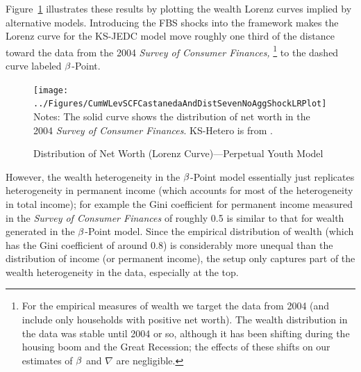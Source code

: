\documentclass[12pt,titlepage]{econtex}
\begin{document}
Figure~\ref{CumWLevSCFCastanedaAndDistSevenNoAggShockPlot}
illustrates these results by plotting the wealth Lorenz curves
implied by alternative models. Introducing the FBS shocks into the
framework makes the Lorenz curve for the KS-JEDC  model move roughly
one third of the distance toward the data from the 2004 \emph{Survey of
Consumer Finances,}%
\footnote{%
For the empirical measures of wealth we target the data from 2004 (and include only households with positive net worth). The wealth distribution in the data was stable until 2004 or so, although it has been shifting
during the housing boom and the Great Recession; the effects of these shifts on our estimates of
 $\beta$ and $\nabla$ are negligible.
}
 to the dashed curve labeled $\beta$-Point.

\begin{figure}
\caption{Distribution of Net Worth (Lorenz Curve)---Perpetual Youth Model}
\label{CumWLevSCFCastanedaAndDistSevenNoAggShockPlot}
\texttt{[image: ../Figures/CumWLevSCFCastanedaAndDistSevenNoAggShockLRPlot]}
\footnotesize Notes: The solid curve shows the distribution of net worth in the 2004 \emph{Survey of Consumer Finances}. KS-Hetero is from \citet{ksHetero}.
\end{figure}

However, the wealth heterogeneity in the $\beta$-Point model essentially just replicates heterogeneity in permanent income (which accounts for most of the heterogeneity in total income); for example the Gini coefficient for permanent income measured in the \emph{Survey of Consumer Finances} of roughly 0.5 is similar to that for wealth generated in the $\beta$-Point model.  Since the empirical distribution of wealth (which has the Gini coefficient of around 0.8) is considerably more unequal than the distribution of income (or permanent income), the setup only captures part of the wealth heterogeneity in the data, especially at the top.
\end{document}
